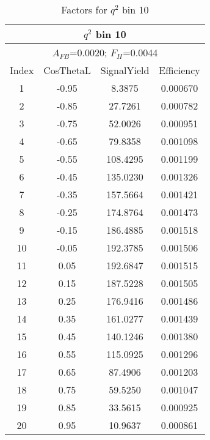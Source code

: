 \begin{table*}[htbH]
  \begin{center}
  \caption{Factors for $q^2$ bin 10 
  \label{tab:factors_bin10}}
  \small
  \begin{tabular}{|c||c|c|c|}
    \hline
    \multicolumn{4}{|c|}{$q^2$ bin 10} \\ 
    \hline
    \multicolumn{4}{|c|}{$A_{FB}$=0.0020;   $F_{H}$=0.0044} \\ 
    \hline
    Index & CosThetaL & SignalYield & Efficiency \\ 
    \hline
    1 & -0.95 & 8.3875 & 0.000670 \\ 
    2 & -0.85 & 27.7261 & 0.000782 \\ 
    3 & -0.75 & 52.0026 & 0.000951 \\ 
    4 & -0.65 & 79.8358 & 0.001098 \\ 
    5 & -0.55 & 108.4295 & 0.001199 \\ 
    6 & -0.45 & 135.0230 & 0.001326 \\ 
    7 & -0.35 & 157.5664 & 0.001421 \\ 
    8 & -0.25 & 174.8764 & 0.001473 \\ 
    9 & -0.15 & 186.4885 & 0.001518 \\ 
    10 & -0.05 & 192.3785 & 0.001506 \\ 
    11 & 0.05 & 192.6847 & 0.001515 \\ 
    12 & 0.15 & 187.5228 & 0.001505 \\ 
    13 & 0.25 & 176.9416 & 0.001486 \\ 
    14 & 0.35 & 161.0277 & 0.001439 \\ 
    15 & 0.45 & 140.1246 & 0.001380 \\ 
    16 & 0.55 & 115.0925 & 0.001296 \\ 
    17 & 0.65 & 87.4906 & 0.001203 \\ 
    18 & 0.75 & 59.5250 & 0.001047 \\ 
    19 & 0.85 & 33.5615 & 0.000925 \\ 
    20 & 0.95 & 10.9637 & 0.000861 \\ 
    \hline
  \end{tabular}
  \end{center}
\end{table*}



